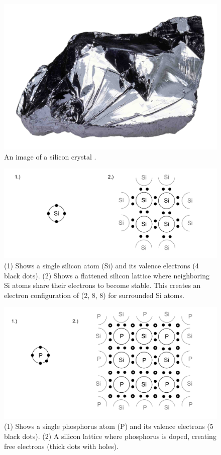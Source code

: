 \begin{figure}[ht!]

  \centering
  \includegraphics[width=.6\textwidth]{Sections/circuits/sicryst.jpg}
  \caption{An image of a silicon crystal \cite{gettyimages700832601}.}
  \label{fig:atom}
\end{figure}

\begin{figure}[ht!]

  \centering
  \includegraphics[width=\textwidth]{Sections/circuits/doping.png}
  \caption{(1) Shows a single silicon atom (Si) and its valence electrons (4 black dots).
  (2) Shows a flattened silicon lattice where neighboring Si atoms share their electrons to become stable.
  This creates an electron configuration of (2, 8, 8) for surrounded Si atoms.}
  \label{fig:doping}
\end{figure}
   
\newpage 

\noindent
\begin{figure}[ht!] 
  \centering
  \includegraphics[width=\textwidth]{Sections/circuits/n-type.png}
  \caption{(1) Shows a single phosphorus atom (P) and its valence electrons (5 black dots).
  (2) A silicon lattice where phosphorus is doped, creating free electrons (thick dots with holes). }
  \label{fig:doping2}
\end{figure}

